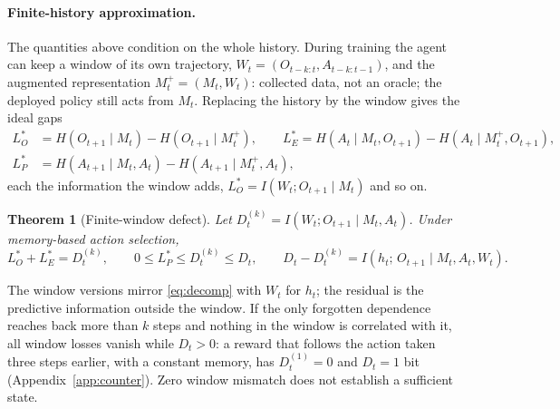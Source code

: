 \documentclass[11pt]{article}
\theoremstyle{plain}
\newtheorem{theorem}{Theorem}
\theoremstyle{definition}
\theoremstyle{remark}
\begin{document}
\paragraph{Finite-history approximation.}
The quantities above condition on the whole history. During training the agent can keep a window of its own trajectory, $W_t = (O_{t-k:t}, A_{t-k:t-1})$, and the augmented representation $M^+_t = (M_t, W_t)$: collected data, not an oracle; the deployed policy still acts from $M_t$. Replacing the history by the window gives the ideal gaps
\begin{align}
L^*_O &= H(O_{t+1} \mid M_t) - H(O_{t+1} \mid M^+_t), \qquad L^*_E = H(A_t \mid M_t, O_{t+1}) - H(A_t \mid M^+_t, O_{t+1}), \nonumber\\
L^*_P &= H(A_{t+1} \mid M_t, A_t) - H(A_{t+1} \mid M^+_t, A_t), \label{eq:windowlosses}
\end{align}
each the information the window adds, $L^*_O = I(W_t; O_{t+1} \mid M_t)$ and so on.
\begin{theorem}[Finite-window defect]\label{thm:window}
Let $D^{(k)}_t = I(W_t; O_{t+1} \mid M_t, A_t)$. Under memory-based action selection,
\[
L^*_O + L^*_E = D^{(k)}_t, \qquad 0 \le L^*_P \le D^{(k)}_t \le D_t, \qquad D_t - D^{(k)}_t = I(h_t;\, O_{t+1} \mid M_t, A_t, W_t).
\]
\end{theorem}
The window versions mirror \eqref{eq:decomp} with $W_t$ for $h_t$; the residual is the predictive information outside the window. If the only forgotten dependence reaches back more than $k$ steps and nothing in the window is correlated with it, all window losses vanish while $D_t > 0$: a reward that follows the action taken three steps earlier, with a constant memory, has $D^{(1)}_t = 0$ and $D_t = 1$ bit (Appendix~\ref{app:counter}). Zero window mismatch does not establish a sufficient state.
\end{document}
